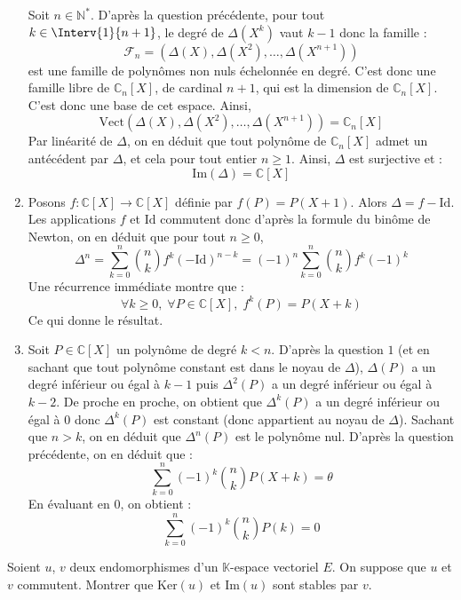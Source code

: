 \documentclass[a4paper,10pt]{report}
\begin{document}
\begin{enumerate}
\noindent Soit $n \in \mathbb{N}^*$. D'après la question précédente, pour tout $k \in \Interv{1}{n+1}$, le degré de $\Delta(X^k)$ vaut $k-1$ donc la famille :
$$ \mathcal{F}_n = (\Delta(X), \Delta(X^2), \ldots, \Delta(X^{n+1}))$$
 est une famille de polynômes non nuls échelonnée en degré. C'est donc une famille libre de $\mathbb{C}_n[X]$, de cardinal $n+1$, qui est la dimension de $\mathbb{C}_n[X]$. C'est donc une base de cet espace. Ainsi,
 $$ \textrm{Vect}(\Delta(X), \Delta(X^2), \ldots, \Delta(X^{n+1})) = \mathbb{C}_n[X]$$
 Par linéarité de $\Delta$, on en déduit que tout polynôme de $\mathbb{C}_n[X]$ admet un antécédent par $\Delta$, et cela pour tout entier $n \geq 1$. Ainsi, $\Delta$ est surjective et :
 $$ \textrm{Im}(\Delta) = \mathbb{C}[X]$$
 \item Posons $f : \mathbb{C}[X] \rightarrow \mathbb{C}[X]$ définie par $f(P)=P(X+1)$. Alors $\Delta = f - \textrm{Id}$. Les applications $f$ et $\textrm{Id}$ commutent donc d'après la formule du binôme de Newton, on en déduit que pour tout $n \geq 0$,
 $$ \Delta^n = \sum_{k=0}^n \binom{n}{k} f^k (- \textrm{Id})^{n-k}  = (-1)^n \sum_{k=0}^n \binom{n}{k} f^k (-1)^k$$
 Une récurrence immédiate montre que :
 $$ \forall k \geq 0, \; \forall P \in \mathbb{C}[X], \; f^k (P)= P(X+k)$$
 Ce qui donne le résultat.
 \item Soit $P \in \mathbb{C}[X]$ un polynôme de degré $k <n$. D'après la question $1$ (et en sachant que tout polynôme constant est dans le noyau de $\Delta$), $\Delta(P)$ a un degré inférieur ou égal à $k-1$ puis $\Delta^2(P)$ a un degré inférieur ou égal à $k-2$. De proche en proche, on obtient que $\Delta^k(P)$ a un degré inférieur ou égal à $0$ donc $\Delta^k(P)$ est constant (donc appartient au noyau de $\Delta$). Sachant que $n>k$, on en déduit que $\Delta^n(P)$ est le polynôme nul. D'après la question précédente, on en déduit que :
$$\sum_{k = 0}^{n} ( - 1)^{k} \binom{n}{k}P(X + k) = \theta$$
 En évaluant en $0$, on obtient :
 $$ \sum_{k = 0}^{n} ( - 1)^{k} \binom{n}{k}P(k) = 0$$
\end{enumerate}

\medskip

\begin{Exercice}{} Soient $u$, $v$ deux endomorphismes d'un $\mathbb{K}$-espace vectoriel $E$. On suppose que $u$ et $v$ commutent. Montrer que $\textrm{Ker}(u)$ et $\textrm{Im}(u)$ sont stables par $v$.
\end{Exercice} 

\corr 

\medskip
\end{document}
